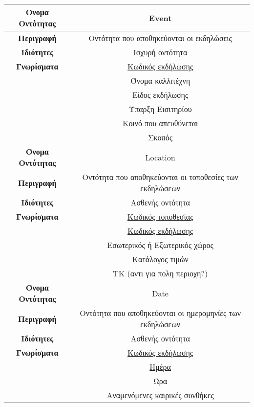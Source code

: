 \begin{center}
\begin{tabular}[]{|c | c|}
\hline
\textbf{Όνομα Οντότητας}   &  Event  \\ \hline 
\textbf{Περιγραφή}         &  Οντότητα που αποθηκεύονται οι εκδηλώσεις \\ \hline 
\textbf{Ιδιότητες}         &  Ισχυρή οντότητα \\  \hline               
\textbf{Γνωρίσματα}        &  \underline{Κωδικός εκδήλωσης} \\
                           &  Όνομα καλλιτέχνη\\
           ~               &  Είδος εκδήλωσης \\
            ~              &  Ύπαρξη Εισιτηρίου \\
             ~             &  Κοινό που απευθύνεται \\
              ~            &  Σκοπός \\ 
\hline
\hline
\textbf{Όνομα Οντότητας}   &  Location \\ \hline 
\textbf{Περιγραφή}         &  Οντότητα που αποθηκεύονται οι τοποθεσίες των εκδηλώσεων \\ \hline 
\textbf{Ιδιότητες}         &  Ασθενής οντότητα \\ \hline 
\textbf{Γνωρίσματα}        &  \underline{Κωδικός τοποθεσίας} \\
                           &  \underline{Κωδικός εκδήλωσης}\\
           ~               &  Εσωτερικός ή Εξωτερικός χώρος \\
            ~              &  Κατάλογος τιμών \\
             ~             &  ΤΚ (αντι για πολη περιοχη?)\\
\hline
\hline
\textbf{Όνομα Οντότητας}   &  Date \\ \hline 
\textbf{Περιγραφή}         &  Οντότητα που αποθηκεύονται οι ημερομηνίες των εκδηλώσεων \\ \hline 
\textbf{Ιδιότητες}         &  Ασθενής οντότητα \\ \hline 
\textbf{Γνωρίσματα}        &  \underline{Κωδικός εκδήλωσης}\\
                           &  \underline{Ημέρα} \\
           ~               &  Ώρα \\
            ~              &  Αναμενόμενες καιρικές συνθήκες \\
\hline
\end{tabular}


\end{center}
